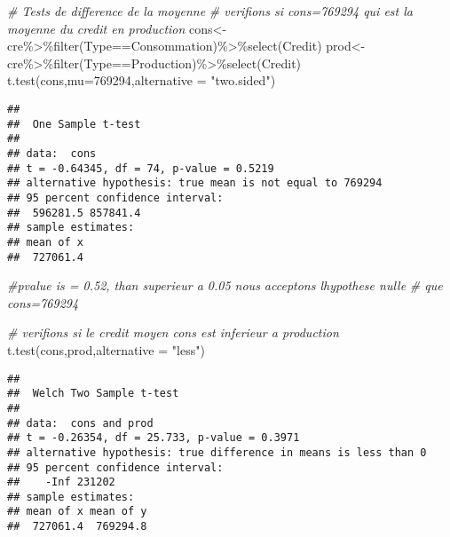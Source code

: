 \documentclass[
]{article}
\newenvironment{Shaded}{\begin{snugshade}}{\end{snugshade}}
\newcommand{\AttributeTok}[1]{\textcolor[rgb]{0.77,0.63,0.00}{#1}}
\newcommand{\CommentTok}[1]{\textcolor[rgb]{0.56,0.35,0.01}{\textit{#1}}}
\newcommand{\DecValTok}[1]{\textcolor[rgb]{0.00,0.00,0.81}{#1}}
\newcommand{\FunctionTok}[1]{\textcolor[rgb]{0.00,0.00,0.00}{#1}}
\newcommand{\NormalTok}[1]{#1}
\newcommand{\OtherTok}[1]{\textcolor[rgb]{0.56,0.35,0.01}{#1}}
\newcommand{\SpecialCharTok}[1]{\textcolor[rgb]{0.00,0.00,0.00}{#1}}
\newcommand{\StringTok}[1]{\textcolor[rgb]{0.31,0.60,0.02}{#1}}
\begin{document}
\begin{Shaded}
\begin{Highlighting}[]
\CommentTok{\# Tests de difference de la moyenne}
\CommentTok{\# verifions si cons=769294 qui est la moyenne du credit en production}
\NormalTok{cons}\OtherTok{\textless{}{-}}\NormalTok{cre}\SpecialCharTok{\%\textgreater{}\%}\FunctionTok{filter}\NormalTok{(Type}\SpecialCharTok{==}\StringTok{\textquotesingle{}Consommation\textquotesingle{}}\NormalTok{)}\SpecialCharTok{\%\textgreater{}\%}\FunctionTok{select}\NormalTok{(Credit)}
\NormalTok{prod}\OtherTok{\textless{}{-}}\NormalTok{cre}\SpecialCharTok{\%\textgreater{}\%}\FunctionTok{filter}\NormalTok{(Type}\SpecialCharTok{==}\StringTok{\textquotesingle{}Production\textquotesingle{}}\NormalTok{)}\SpecialCharTok{\%\textgreater{}\%}\FunctionTok{select}\NormalTok{(Credit)}
\FunctionTok{t.test}\NormalTok{(cons,}\AttributeTok{mu=}\DecValTok{769294}\NormalTok{,}\AttributeTok{alternative =} \StringTok{"two.sided"}\NormalTok{)}
\end{Highlighting}
\end{Shaded}

\begin{verbatim}
## 
##  One Sample t-test
## 
## data:  cons
## t = -0.64345, df = 74, p-value = 0.5219
## alternative hypothesis: true mean is not equal to 769294
## 95 percent confidence interval:
##  596281.5 857841.4
## sample estimates:
## mean of x 
##  727061.4
\end{verbatim}

\begin{Shaded}
\begin{Highlighting}[]
\CommentTok{\#pvalue is = 0.52, than superieur a 0.05 nous acceptons l\textquotesingle{}hypothese nulle}
\CommentTok{\# que cons=769294}


\CommentTok{\# verifions si le credit moyen cons est inferieur a production}
\FunctionTok{t.test}\NormalTok{(cons,prod,}\AttributeTok{alternative =} \StringTok{"less"}\NormalTok{)}
\end{Highlighting}
\end{Shaded}

\begin{verbatim}
## 
##  Welch Two Sample t-test
## 
## data:  cons and prod
## t = -0.26354, df = 25.733, p-value = 0.3971
## alternative hypothesis: true difference in means is less than 0
## 95 percent confidence interval:
##    -Inf 231202
## sample estimates:
## mean of x mean of y 
##  727061.4  769294.8
\end{verbatim}
\end{document}
